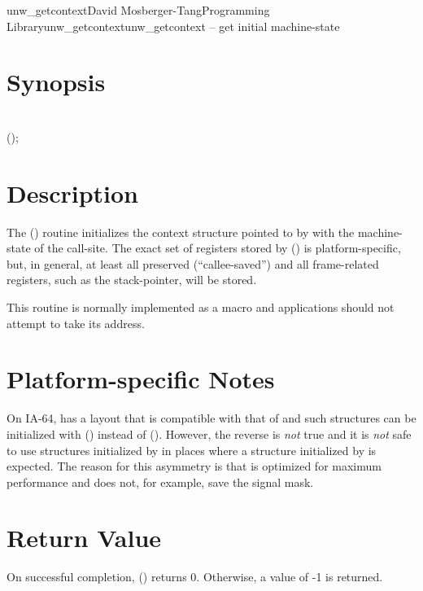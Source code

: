 \documentclass{article}
\begin{document}
\begin{Name}{3}{unw\_getcontext}{David Mosberger-Tang}{Programming Library}{unw\_getcontext}unw\_getcontext -- get initial machine-state
\end{Name}

\section{Synopsis}

\\

 ();\\

\section{Description}

The () routine initializes the context structure
pointed to by  with the machine-state of the call-site.  The
exact set of registers stored by () is
platform-specific, but, in general, at least all preserved
(``callee-saved'') and all frame-related registers, such as the
stack-pointer, will be stored.

This routine is normally implemented as a macro and applications
should not attempt to take its address.

\section{Platform-specific Notes}

On IA-64,  has a layout that is compatible with
that of  and such structures can be initialized with
() instead of ().  However, the
reverse is \emph{not} true and it is \emph{not} safe to use structures
initialized by  in places where a structure
initialized by  is expected. The reason for this
asymmetry is that  is optimized for maximum
performance and does not, for example, save the signal mask.

\section{Return Value}

On successful completion, () returns 0.
Otherwise, a value of -1 is returned.
\end{document}
